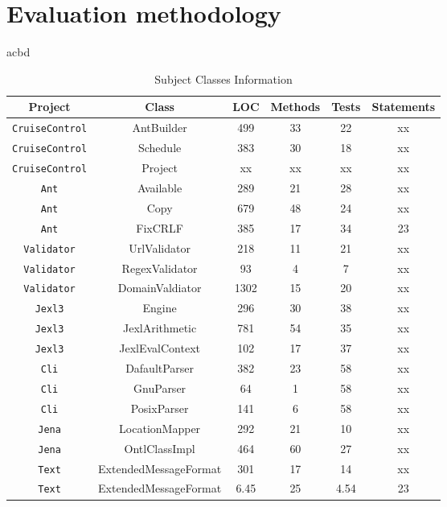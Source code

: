 \section{Evaluation methodology}

acbd

\begin{table*}
\begin{center}
\begin{tabular}{|c||c|c|c|c|c|}
\hline
\hline

\hline
Project & Class & LOC & Methods & Tests & Statements \\
\hline
\hline
{\tt CruiseControl} & AntBuilder & 499 & 33 & 22 & xx\\
\hline
{\tt CruiseControl} & Schedule & 383 & 30 & 18 & xx\\
\hline
{\tt CruiseControl} & Project & xx & xx & xx & xx\\
\hline
{\tt Ant} & Available & 289 & 21 & 28 & xx\\
\hline
{\tt Ant} & Copy & 679 & 48 & 24 & xx\\
\hline
{\tt Ant} & FixCRLF & 385 & 17 & 34 & 23\\
\hline
{\tt Validator} & UrlValidator & 218 & 11 & 21 & xx\\
\hline
{\tt Validator} & RegexValidator & 93 & 4 & 7 & xx\\
\hline
{\tt Validator} & DomainValdiator & 1302 & 15 & 20 & xx\\
\hline
{\tt Jexl3} & Engine & 296 & 30 & 38 & xx\\
\hline
{\tt Jexl3} & JexlArithmetic & 781 & 54 & 35 & xx\\
\hline
{\tt Jexl3} & JexlEvalContext & 102 & 17 & 37 & xx\\
\hline
{\tt Cli} & DafaultParser & 382 & 23 & 58 & xx\\
\hline
{\tt Cli} & GnuParser & 64 & 1 & 58 & xx\\
\hline
{\tt Cli} & PosixParser & 141 & 6 & 58 & xx\\
\hline
{\tt Jena} & LocationMapper & 292 & 21 & 10 & xx\\
\hline
{\tt Jena} & OntlClassImpl & 464 & 60 & 27 & xx\\
\hline
{\tt Text} & ExtendedMessageFormat & 301 & 17 & 14 & xx\\
\hline
{\tt Text} & ExtendedMessageFormat & 6.45 & 25 & 4.54 & 23\\

\hline
\hline
\end{tabular}
\end{center}
\caption{Subject Classes Information}
\label{tab:avgimproved}
\end{table*}



